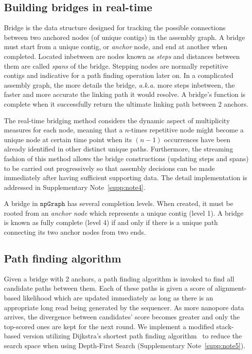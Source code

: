 \documentclass[10pt,twocolumn,twoside]{genpaper}
\newcommand{\npgraph}{$\mathtt{npGraph}$}
\begin{document}
\subsection*{Building bridges in real-time}
Bridge is the data structure designed for tracking the possible connections between two anchored nodes (of unique contigs) in the assembly graph.
A bridge must start from a unique contig, or \emph{anchor} node, and end at another when completed. Located inbetween are nodes known as \emph{steps} and distances between them are called \emph{spans} of the bridge. Stepping nodes are normally repetitive contigs and indicative for a path finding operation later on. In a complicated assembly graph, the more details the bridge, \emph{a.k.a.} more steps inbetween, the faster and more accurate the linking path it would resolve. A bridge's function is complete when it successfully return the ultimate linking path between 2 anchors.

The real-time bridging method considers the dynamic aspect of multiplicity measures for each node, meaning that a $n$-times repetitive node might become a unique node at certain time point when its $(n-1)$ occurrences have been already identified in other distinct unique paths. 
Furthermore, the streaming fashion of this method allows the bridge constructions (updating steps and spans) to be carried out progressively so that assembly decisions can be made immediately after having sufficient supporting data.
The detail implementation is addressed in Supplementary Note~\ref{supp:note4}.

A bridge in \npgraph{} has several completion levels. When created, it must be rooted from an \emph{anchor node} which represents a unique contig (level 1). A bridge is known as fully complete (level 4) if and only if there is a unique path connecting its two anchor nodes from two ends. 

\subsection*{Path finding algorithm}
Given a bridge with 2 anchors, a path finding algorithm is invoked to find all candidate paths between them. Each of these paths is given a score of alignment-based likelihood which are updated immediately as long as there is an appropriate long read being generated by the sequencer. As more nanopore data arrives, the divergence between candidates' score becomes greater and only the top-scored ones are kept for the next round.
We implement a modified stack-based version utilizing Dijkstra's shortest path finding algorithm~\cite{Dijkstra1959} to reduce the search space when using Depth-First Search (Supplementary Note~\ref{supp:note5}).
\end{document}
